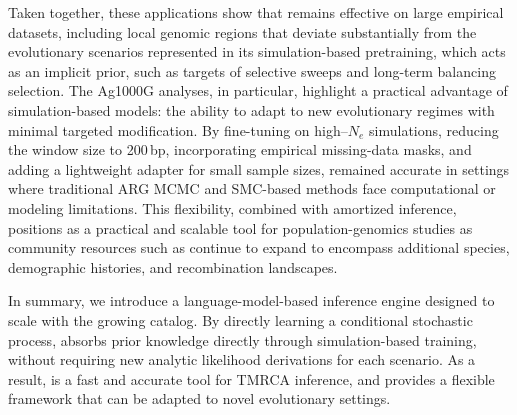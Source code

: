 \documentclass[9pt,twocolumn,twoside]{pnas-new} %
\providecommand{\DIFdelbegin}{} %
\begin{document}
Taken together, these applications show that \cxtkit remains effective on large empirical datasets, 
including local genomic regions that deviate substantially from the evolutionary scenarios represented in its simulation-based pretraining, which acts as an implicit prior, 
such as targets of selective sweeps and long-term balancing selection.
The Ag1000G analyses, in particular, highlight a practical advantage of simulation-based models: the ability to adapt to new evolutionary regimes with minimal targeted modification.
By fine-tuning on high--$N_e$ simulations, reducing the window size to 200\,bp, incorporating empirical missing-data masks, and adding a lightweight adapter for small sample sizes, \cxtkit remained accurate in settings where traditional ARG MCMC and SMC-based methods face computational or modeling limitations.
This flexibility, combined with amortized inference, positions \cxtkit as a practical and scalable tool for population-genomics studies as community resources such as \stdpopsim continue to expand to encompass additional species, demographic histories, and recombination landscapes.


In summary, we introduce a language-model-based inference engine designed to scale with the growing \stdpopsim catalog.
By directly learning a conditional stochastic process, \cxtkit absorbs prior knowledge directly through simulation-based training, without requiring new analytic likelihood derivations for each scenario.
As a result, \cxtkit is a fast and accurate tool for TMRCA inference, and provides a flexible framework that can be adapted to novel evolutionary settings.


\DIFdelbegin %

\end{document}
